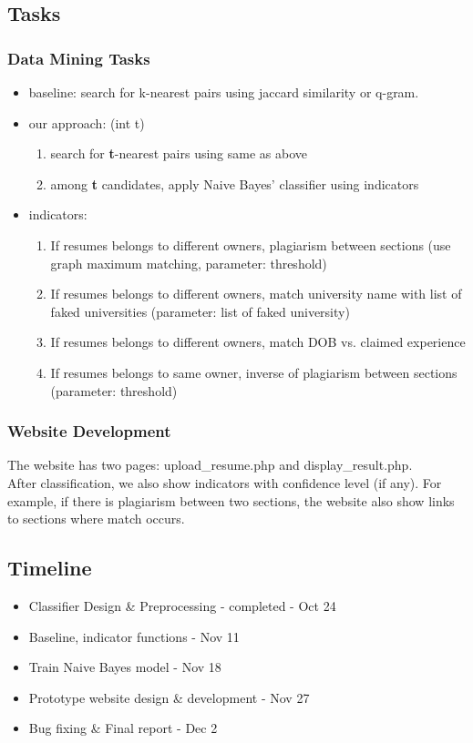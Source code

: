 \documentclass{article}
\begin{document}
\subsection{Tasks}
\subsubsection{Data Mining Tasks}
\begin{itemize}
	\item baseline: search for k-nearest pairs using jaccard similarity or q-gram. 
	\item our approach: (int t)
	\begin{enumerate}
		\item search for \textbf{t}-nearest pairs using same as above
		\item among \textbf{t} candidates, apply Naive Bayes' classifier using indicators
	\end{enumerate}
	\item indicators:
	\begin{enumerate}
		\item If resumes belongs to different owners, plagiarism between sections (use graph maximum matching, parameter: threshold)
		\item If resumes belongs to different owners, match university name with list of faked universities (parameter: list of faked university) 
		\item If resumes belongs to different owners, match DOB vs. claimed experience
		\item If resumes belongs to same owner, inverse of
                  plagiarism between sections (parameter: threshold)
	\end{enumerate}
\end{itemize}
 \subsubsection{Website Development}
The website has two pages: upload\_resume.php and display\_result.php. \\
 After classification, we also show indicators with confidence level
 (if any). For example, if there is plagiarism between two sections,
 the website also show links to sections where match occurs.
\subsection{Timeline}
\begin{itemize}
\item Classifier Design \& Preprocessing - completed - Oct 24
\item Baseline, indicator functions - Nov 11
\item Train Naive Bayes model - Nov 18
\item Prototype website design \& development - Nov 27
\item Bug fixing \& Final report - Dec 2
\end{itemize}
\end{document}
